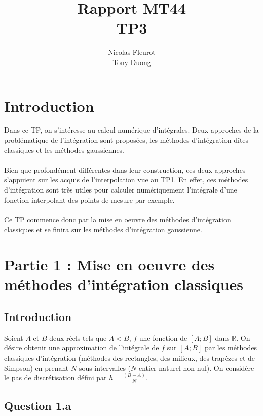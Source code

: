 \documentclass[a4paper,10pt]{report}
\title{Rapport MT44\\\huge{TP3}}
\author{Nicolas Fleurot\\Tony Duong}
\newcommand{\R}{\mathbb{R}}
\begin{document}
\maketitle

\tableofcontents

\chapter*{Introduction}

Dans ce TP, on s’intéresse au calcul numérique d’intégrales. Deux approches de la problématique de l’intégration sont proposées, les méthodes d’intégration dîtes classiques et les méthodes gaussiennes.
\\
\\
Bien que profondément différentes dans leur construction, ces deux approches s’appuient sur les acquis de l’interpolation vue au TP1. En effet, ces méthodes d'intégration sont très utiles pour calculer numériquement l'intégrale d'une fonction interpolant des points de mesure par exemple. 
\\
\\Ce TP commence donc par la mise en oeuvre des méthodes d’intégration classiques et se finira sur les méthodes d’intégration gaussienne.


\chapter*{Partie 1 : Mise en oeuvre des méthodes d'intégration classiques}

\section*{Introduction}

Soient $A$ et $B$ deux réels tels que $A < B$, $f$ une fonction de $[A;B]$ dans $\R$. On désire obtenir une approximation de l'intégrale de $f$ sur $[A;B]$ par les méthodes  classiques d'intégration (méthodes des rectangles, des milieux, des trapèzes et de   Simpson) en prenant $N$ sous-intervalles ($N$ entier naturel non nul). On considère le    pas de discrétisation défini par $h = \frac{(B - A)}{N}$.

\section*{Question 1.a}
\end{document}

